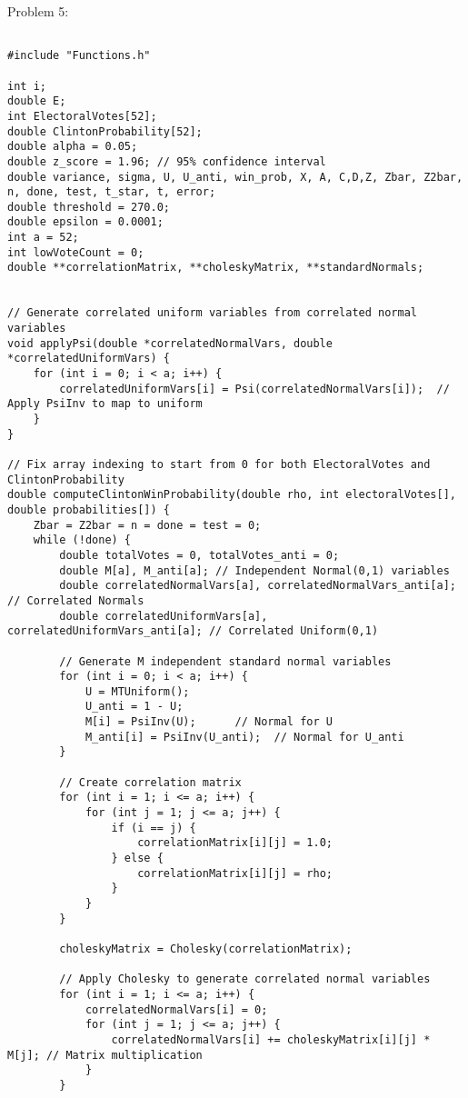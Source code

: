 \documentclass{report}
\begin{document}
Problem 5:
\begin{lstlisting}

#include "Functions.h"

int i;
double E;
int ElectoralVotes[52];
double ClintonProbability[52];
double alpha = 0.05;
double z_score = 1.96; // 95% confidence interval
double variance, sigma, U, U_anti, win_prob, X, A, C,D,Z, Zbar, Z2bar, n, done, test, t_star, t, error; 
double threshold = 270.0;
double epsilon = 0.0001;
int a = 52;
int lowVoteCount = 0;
double **correlationMatrix, **choleskyMatrix, **standardNormals;


// Generate correlated uniform variables from correlated normal variables
void applyPsi(double *correlatedNormalVars, double *correlatedUniformVars) {
    for (int i = 0; i < a; i++) {
        correlatedUniformVars[i] = Psi(correlatedNormalVars[i]);  // Apply PsiInv to map to uniform
    }
}

// Fix array indexing to start from 0 for both ElectoralVotes and ClintonProbability
double computeClintonWinProbability(double rho, int electoralVotes[], double probabilities[]) {
    Zbar = Z2bar = n = done = test = 0;
    while (!done) {
        double totalVotes = 0, totalVotes_anti = 0;
        double M[a], M_anti[a]; // Independent Normal(0,1) variables
        double correlatedNormalVars[a], correlatedNormalVars_anti[a]; // Correlated Normals
        double correlatedUniformVars[a], correlatedUniformVars_anti[a]; // Correlated Uniform(0,1)

        // Generate M independent standard normal variables
        for (int i = 0; i < a; i++) {
            U = MTUniform();
            U_anti = 1 - U;
            M[i] = PsiInv(U);      // Normal for U
            M_anti[i] = PsiInv(U_anti);  // Normal for U_anti
        }

        // Create correlation matrix 
        for (int i = 1; i <= a; i++) {
            for (int j = 1; j <= a; j++) {
                if (i == j) {
                    correlationMatrix[i][j] = 1.0;
                } else {
                    correlationMatrix[i][j] = rho;
                }
            }
        }

        choleskyMatrix = Cholesky(correlationMatrix);

        // Apply Cholesky to generate correlated normal variables
        for (int i = 1; i <= a; i++) {
            correlatedNormalVars[i] = 0;
            for (int j = 1; j <= a; j++) {
                correlatedNormalVars[i] += choleskyMatrix[i][j] * M[j]; // Matrix multiplication
            }
        }


\end{lstlisting}
\end{document}
